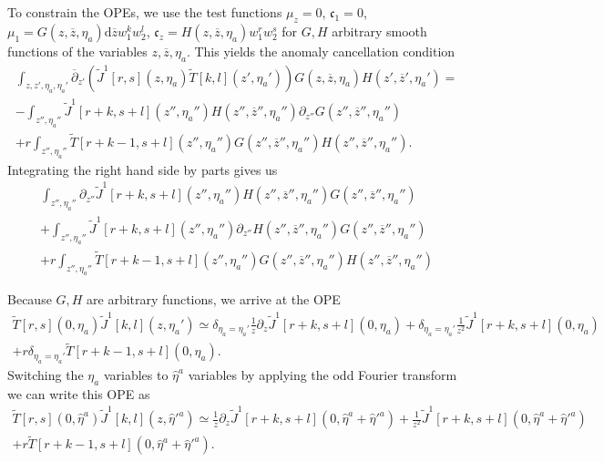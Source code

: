 \documentclass[11pt]{amsart}
\newcommand{\dbar}{\br{\partial}}
\newcommand{\zbar}{\br{z}}
\newcommand{\what}{\widehat}
\newcommand{\til}{\widetilde}
\newcommand{\br}{\overline}
\newcommand{\mf}{\mathfrak}
\renewcommand{\d}{\mathrm{d}}
\theoremstyle{thm}
\numberwithin{equation}{subsection}
\theoremstyle{def}
\theoremstyle{rem}
\newcommand{\fc}{\mf{c}}
\begin{document}
To constrain the OPEs, we use the test functions $\mu_z = 0$, $\fc_1 = 0$, $\mu_1 = G(z,\zbar,\eta_a) \d \zbar w_1^k w_2^l$, 
$\fc_z = H(z,\zbar,\eta_a) w_1^r w_2^s$
for $G,H$ arbitrary smooth functions of the variables $z,\zbar,\eta_a$.
This yields the anomaly cancellation condition
\begin{multline}
\int_{z,z',\eta_a,\eta_a'} \dbar_{z'}\left(\til{J}^1 [r,s] (z,\eta_a) \til{T}[k,l](z',\eta_a')\right) G(z,\zbar,\eta_a) H(z',\zbar', \eta_a') = \\
- \int_{z'', \eta_a''} \til{J}^1[r+k, s+l] (z'', \eta_a'') H(z'', \zbar'', \eta_a'') \partial_{z''} G(z'', \zbar'', \eta_a'') \\ 
+ r \int_{z'',\eta_a''} \til{T}[r+k-1, s+l] (z'',\eta_a'') G(z'',\zbar'', \eta_a'') H(z'',\zbar'', \eta_a'') .
\end{multline}
Integrating the right hand side by parts gives us
\begin{multline}
\int_{z'', \eta_a''} \partial_{z''} \til{J}^1[r+k, s+l] (z'', \eta_a'') H(z'', \zbar'', \eta_a'') G(z'', \zbar'', \eta_a'') \\ +  \int_{z'', \eta_a''} \til{J}^1[r+k, s+l] (z'', \eta_a'') \partial_{z''} H(z'', \zbar'', \eta_a'')  G(z'', \zbar'', \eta_a'') \\
+ r \int_{z'',\eta_a''} \til{T}[r+k-1, s+l] (z'',\eta_a'') G(z'',\zbar'', \eta_a'') H(z'',\zbar'', \eta_a'') 
\end{multline}

Because $G,H$ are arbitrary functions, we arrive at the OPE
\begin{multline}
\til{T}[r,s](0,\eta_a) \til{J}^1[k,l] (z,\eta_a') \simeq \delta_{\eta_a=\eta_a'} \frac1z \partial_z \til{J}^1[r+k,s+l](0,\eta_a) + \delta_{\eta_a=\eta_a'} \frac{1}{z^2} \til{J}^1[r+k,s+l](0,\eta_a) \\ + r \delta_{\eta_a=\eta_a'} \til{T}[r+k-1,s+l] (0,\eta_a).
\end{multline}
Switching the $\eta_a$ variables to $\what{\eta}^a$ variables by applying the odd Fourier transform we can write this OPE as
\begin{multline}
\til{T}[r,s](0,\what{\eta}^a) \til{J}^1[k,l] (z,\what{\eta}'^a) \simeq \frac1z \partial_z \til{J}^1[r+k,s+l](0,\what{\eta}^a + \what{\eta}'^a) + \frac{1}{z^2} \til{J}^1[r+k,s+l](0,\what{\eta}^a + \what{\eta}'^a)  \\ + r \til{T}[r+k-1,s+l] (0,\what{\eta}^a + \what{\eta}'^a) .
\end{multline}

\subsubsection{}
\end{document}
